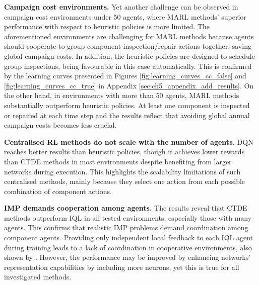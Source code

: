 \textbf{Campaign cost environments.} Yet another challenge can be observed in campaign cost environments under 50 agents, where MARL methods' superior performance with respect to heuristic policies is more limited.
The aforementioned environments are challenging for MARL methods because agents should cooperate to group component inspection/repair actions together, saving global campaign costs.
In addition, the heuristic policies are designed to schedule group inspections, being favourable in this case automatically.
This is confirmed by the learning curves presented in Figures \ref{fig:learning_curves_cc_false} and \ref{fig:learning_curves_cc_true} in Appendix \ref{sec:ch5_appendix_add_results}.
On the other hand, in environments with more than 50 agents, MARL methods substantially outperform heuristic policies.
At least one component is inspected or repaired at each time step and the results reflect that avoiding global annual campaign costs becomes less crucial.

\textbf{Centralised RL methods do not scale with the number of agents.}
DQN reaches better results than heuristic policies, though it achieves lower rewards than CTDE methods in most environments despite benefiting from larger networks during execution.
This highlights the scalability limitations of such centralised methods, mainly because they select one action from each possible combination of component actions.

\textbf{IMP demands cooperation among agents.}
The results reveal that CTDE methods outperform IQL in all tested environments, especially those with many agents.
This confirms that realistic IMP problems demand coordination among component agents.
Providing only independent local feedback to each IQL agent during training leads to a lack of coordination in cooperative environments, also shown by \cite{Rashid2018}. 
However, the performance may be improved by enhancing networks' representation capabilities by including more neurons, yet this is true for all investigated methods.

